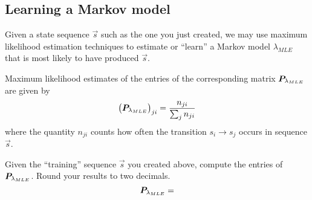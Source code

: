 
\color{black}
\subsection*{Learning a Markov model}

Given a state sequence $\vec{s}$ such as the one you just created, we may use maximum likelihood estimation techniques to estimate or ``learn'' a Markov model $\lambda_{MLE}$ that is most likely to have produced $\vec{s}$.

Maximum likelihood estimates of the entries of the corresponding matrix $\bm{P}_{\lambda_{MLE}}$ are given by
\begin{equation*}
\bigl( \bm{P}_{\lambda_{MLE}} \bigr)_{ji} = \frac{n_{ji}}{\sum_j n_{ji}}
\end{equation*}
where the quantity $n_{ji}$ counts how often the transition $s_i \rightarrow s_j$ occurs in sequence $\vec{s}$.

Given the ``training'' sequence $\vec{s}$ you created above, compute the entries of $\bm{P}_{\lambda_{MLE}}$. Round your results to two decimals.
\color{blue}
\begin{equation*}
\bm{P}_{\lambda_{MLE}} = 
\end{equation*}
\color{black}



